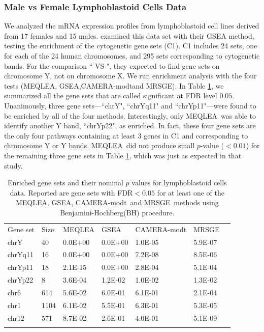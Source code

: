 \documentclass[a4,center,fleqn]{NAR}
\newcommand{\OurMethod}{MEQLEA}
\newcommand{\CMT}{CAMERA-modt}
\newcommand{\genr}{MRSGE}
\newcommand{\FDR}{Benjamini-Hochberg}
\newcommand{\FDRabb}{BH}
\begin{document}
	\subsubsection{Male vs Female Lymphoblastoid Cells Data}
	We analyzed the mRNA expression profiles from lymphoblastoid cell lines derived from 17 females and
	15 males. \cite{subramanian2005gene} examined this data set with their GSEA method, testing the
	enrichment of the  cytogenetic gene sets (C1). C1 includes 24 sets, one for each of the 24 human
	chromosomes, and 295 sets corresponding to cytogenetic bands. For the comparison `` VS
	", they expected to find gene sets on chromosome Y, not on chromosome X. We run
	enrichment analysis with the four tests (\OurMethod, GSEA,\CMT and \genr). In Table
	\ref{table:gender}, we summarized all the gene sets that are called significant at FDR level $0.05$.
	Unanimously, three gene sets---``chrY", ``chrYq11" and ``chrYp11"---were found to be enriched by all
	of the four methods. Interestingly, only \OurMethod~was able to identify another Y band, ``chrYp22",
	as enriched. In fact, these four gene sets are the only four pathways containing at least 3 genes in
	C1 and corresponding to chromosome Y or Y bands. \OurMethod~did not produce small $p$-value ($<
	0.01$) for the remaining three gene sets in Table \ref{table:gender}, which was just as expected in
	that study.
	
	\begin{table}[!ht]
		\centering
		\caption{Enriched gene sets and their nominal $p$ values for lymphoblastoid cells data. Reported
			are gene sets with FDR$<0.05$ for at least one of the \OurMethod, GSEA, \CMT~and \genr~methods using
			\FDR(\FDRabb) procedure.}
		\begin{tabular}{p{2cm}p{1cm}p{2cm}p{2cm}p{3cm}p{2cm}p{0.5cm}} \toprule
			Gene set & Size & \OurMethod & GSEA & \CMT & \genr \\ 		\colrule
			chrY & 40 & 0.0E+00 & 0.0E+00 & 1.0E-05 & 5.9E-07 \\ 
			chrYq11 & 16 & 0.0E+00 & 0.0E+00 & 7.2E-08 & 8.5E-06 \\ 
			chrYp11 & 18 & 2.1E-15 & 0.0E+00 & 2.8E-04 & 5.1E-04 \\ 
			chrYp22 & 8 & 3.6E-04 & 1.2E-02 & 1.0E-02 & 1.3E-02 \\ 
			chr6 & 614 & 5.6E-02 & 6.0E-01 & 6.1E-01 & 2.1E-04 \\ 
			chr1 & 1104 & 6.1E-02 & 5.5E-01 & 6.3E-01 & 5.3E-05 \\ 
			chr12 & 571 & 8.7E-02 & 2.6E-01 & 4.0E-01 & 5.1E-09 \\ 
			\botrule
		\end{tabular}
		\label{table:gender}
	\end{table}
	
\end{document}
